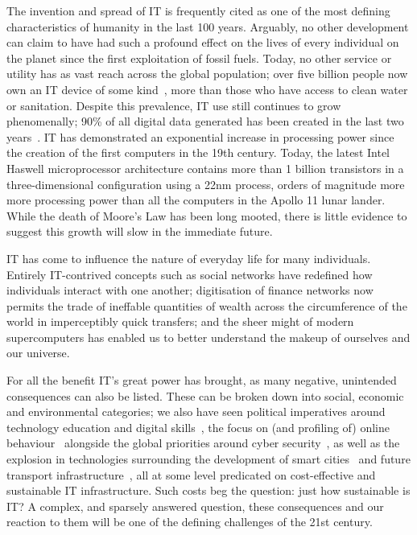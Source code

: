 \documentclass[conference]{IEEEtran}
\begin{document}
The invention and spread of IT is frequently cited as one of the most
defining characteristics of humanity in the last 100 years. Arguably,
no other development can claim to have had such a profound effect on
the lives of every individual on the planet since the first
exploitation of fossil fuels. Today, no other service or utility has
as vast reach across the global population; over five billion people
now own an IT device of some kind~\cite{arup-et-al:2011}, more than
those who have access to clean water or sanitation. Despite this
prevalence, IT use still continues to grow phenomenally; 90\% of all
digital data generated has been created in the last two
years~\cite{bbcnews:2012}. IT has demonstrated an exponential increase
in processing power since the creation of the first computers in the
19th century. Today, the latest Intel Haswell microprocessor
architecture contains more than 1 billion transistors in a
three-dimensional configuration using a 22nm process, orders of
magnitude more more processing power than all the computers in the
Apollo 11 lunar lander. While the death of Moore's Law has been long
mooted, there is little evidence to suggest this growth will slow in
the immediate future.

IT has come to influence the nature of everyday life for many
individuals. Entirely IT-contrived concepts such as social networks
have redefined how individuals interact with one another; digitisation
of finance networks now permits the trade of ineffable quantities of
wealth across the circumference of the world in imperceptibly quick
transfers; and the sheer might of modern supercomputers has enabled us
to better understand the makeup of ourselves and our universe.

For all the benefit IT’s great power has brought, as many negative,
unintended consequences can also be listed. These can be broken down
into social, economic and environmental categories; we also have seen
political imperatives around technology education and digital
skills~\cite{brown-et-al-toce2014}, the focus on (and profiling of)
online behaviour~\cite{oatley+crick:2014} alongside the global
priorities around cyber security~\cite{carr+crick-csss2015}, as well
as the explosion in technologies surrounding the development of smart
cities~\cite{cosgrave-et-al:2014} and future transport
infrastructure~\cite{cooper-et-al-sose}, all at some level predicated
on cost-effective and sustainable IT infrastructure. Such costs beg
the question: just how sustainable is IT? A complex, and sparsely
answered question, these consequences and our reaction to them will be
one of the defining challenges of the 21st century.
\end{document}
